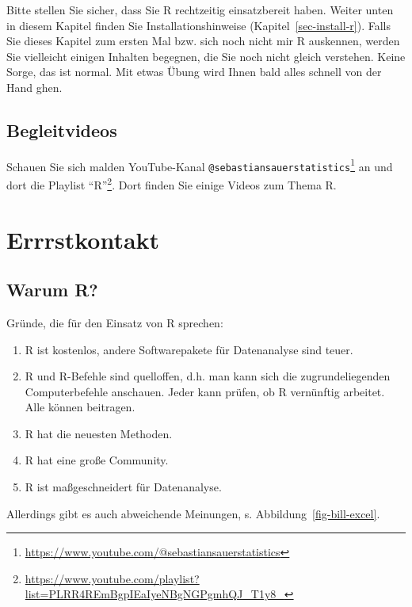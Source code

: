 \documentclass[
  a4paper,
  DIV=11]{scrreprt}
\theoremstyle{definition}
\theoremstyle{definition}
\theoremstyle{definition}
\theoremstyle{remark}
\begin{document}
Bitte stellen Sie sicher, dass Sie R rechtzeitig einsatzbereit haben.
Weiter unten in diesem Kapitel finden Sie Installationshinweise
(Kapitel~\ref{sec-install-r}). Falls Sie dieses Kapitel zum ersten Mal
bzw. sich noch nicht mir R auskennen, werden Sie vielleicht einigen
Inhalten begegnen, die Sie noch nicht gleich verstehen. Keine Sorge, das
ist normal. Mit etwas Übung wird Ihnen bald alles schnell von der Hand
ghen.

\subsection{Begleitvideos}\label{begleitvideos}

Schauen Sie sich malden YouTube-Kanal
\texttt{@sebastiansauerstatistics}\footnote{\url{https://www.youtube.com/@sebastiansauerstatistics}}
an und dort die Playlist ``R''\footnote{\url{https://www.youtube.com/playlist?list=PLRR4REmBgpIEaIyeNBgNGPgmhQJ_T1y8_}}.
Dort finden Sie einige Videos zum Thema R.

\section{Errrstkontakt}\label{errrstkontakt}

\subsection{Warum R?}\label{warum-r}

Gründe, die für den Einsatz von R sprechen:

\begin{enumerate}
\def\labelenumi{\arabic{enumi}.}
\item
  R ist kostenlos, andere Softwarepakete für Datenanalyse sind teuer.
\item
  R und R-Befehle sind quelloffen, d.h. man kann sich die
  zugrundeliegenden Computerbefehle anschauen. Jeder kann prüfen, ob R
  vernünftig arbeitet. Alle können beitragen.
\item
  R hat die neuesten Methoden.
\item
  R hat eine große Community.
\item
  R ist maßgeschneidert für Datenanalyse.
\end{enumerate}

Allerdings gibt es auch abweichende Meinungen, s.
Abbildung~\ref{fig-bill-excel}.
\end{document}
